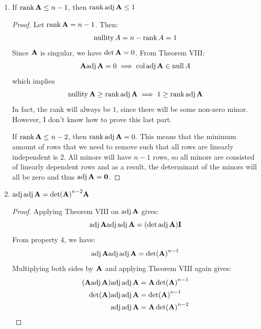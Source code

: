 \documentclass{article}
\begin{document}
\begin{enumerate}
        \item If $\rank \mathbf{A} \le n-1$, then $\rank \mathrm{adj}\,\mathbf{A} \le 1$
        \begin{proof}
            Let $\rank \mathbf{A} = n-1$. Then:
            \begin{equation*}
                \mathrm{nullity}\,A = n - \rank A = 1
            \end{equation*}
            Since $\mathbf{A}$ is singular, we have $\det \mathbf{A}=0$. From Theorem VIII:
            \begin{equation*}
                \mathbf{A}\mathrm{adj}\,\mathbf{A} = 0 \implies \mathrm{col}\,\mathrm{adj}\,\mathbf{A} \in \mathrm{null}\,A
            \end{equation*}
            which implies
            \begin{equation*}
                \mathrm{nullity}\,\mathbf{A} \ge \rank \mathrm{adj}\,\mathbf{A} \implies 1 \ge \rank \mathrm{adj}\,\mathbf{A}
            \end{equation*}
            In fact, the rank will always be $1$, since there will be some non-zero minor. However, I don't know how to prove this last part.
            \vspace{2mm}

            If $\rank \mathbf{A} \le n-2$, then $\rank \mathrm{adj}\,\mathbf{A} = 0.$ This means that the minimum amount of rows that we need to remove such that all rows are linearly independent is $2$. All minors will have $n-1$ rows, so all minors are consisted of linearly dependent rows and as a result, the determinant of the minors will all be zero and thus $\mathrm{adj}\,\mathbf{A} = \mathbf{0}$. 
        \end{proof}
        \item $\mathrm{adj}\,\mathrm{adj}\,\mathbf{A} = \det(\mathbf{A})^{n-2}\mathbf{A}$
        \begin{proof}
            Applying Theorem VIII on $\mathrm{adj}\,\mathbf{A}$ gives:
            \begin{equation*}
                \mathrm{adj}\,\mathbf{A} \mathrm{adj}\,\mathrm{adj}\,\mathbf{A} = (\det \mathrm{adj}\,\mathbf{A})\mathbf{I}
            \end{equation*}
            From property $4$, we have:
            \begin{equation*}
                \mathrm{adj}\,\mathbf{A}\mathrm{adj}\,\mathrm{adj}\,\mathbf{A} = \det(\mathbf{A})^{n-1}
            \end{equation*}
            Multiplying both sides by $\mathbf{A}$ and applying Theorem VIII again gives:
            \begin{align*}
                (\mathbf{A} \mathrm{adj}\,\mathbf{A})\mathrm{adj}\,\mathrm{adj}\,\mathbf{A} &= \mathbf{A}\det(\mathbf{A})^{n-1} \\ 
                \det(\mathbf{A})\mathrm{adj}\,\mathrm{adj}\,\mathbf{A} &= \det(\mathbf{A})^{n-1} \\
                \mathrm{adj}\,\mathrm{adj}\,\mathbf{A} &= \mathbf{A}\det(\mathbf{A})^{n-2} 
            \end{align*}
        \end{proof}
    \end{enumerate}
\end{document}
